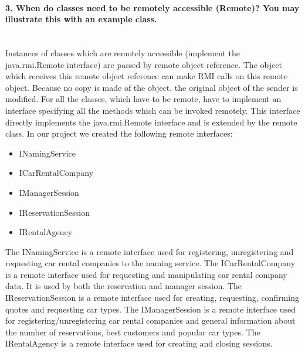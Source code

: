 \documentclass{ds-report}
\begin{document}
	\paragraph{3. When do classes need to be remotely accessible (Remote)? You may illustrate this with an example
class.} \mbox{}\\
Instances of classes which are remotely accessible (implement the java.rmi.Remote interface) are passed by remote object reference. The object which receives this remote object reference can make RMI calls on this remote object. Because no copy is made of the object, the original object of the sender is modified. For all the classes, which have to be remote, have to implement an interface specifying all the methods which can be invoked remotely. This interface directly implements the java.rmi.Remote interface and is extended by the remote class. In our project we created the following remote interfaces:
\begin{itemize}
	\item INamingService
	\item ICarRentalCompany
	\item IManagerSession
	\item IReservationSession
	\item IRentalAgency
\end{itemize} 
The INamingService is a remote interface used for registering, unregistering and requesting car rental companies to the naming service. The ICarRentalCompany is a remote interface used for requesting and manipulating car rental company data. It is used by both the reservation and manager session. The IReservationSession is a remote interface used for creating, requesting, confirming quotes and requesting car types. The IManagerSession is a remote interface used for registering/unregistering car rental companies and general information about the number of reservations, best customers and popular car types. The IRentalAgency is a remote interface used for creating and closing sessions.
\end{document}

